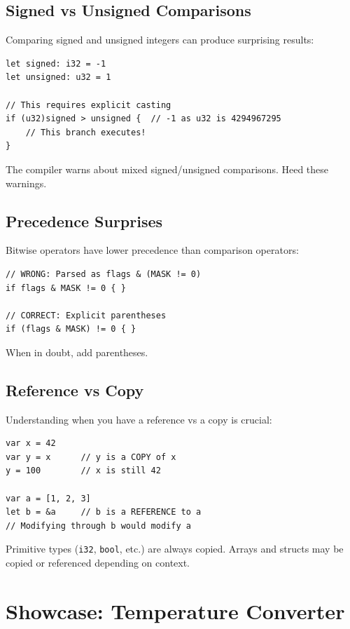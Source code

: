 \subsection{Signed vs Unsigned Comparisons}

Comparing signed and unsigned integers can produce surprising results:

\begin{lstlisting}
let signed: i32 = -1
let unsigned: u32 = 1

// This requires explicit casting
if (u32)signed > unsigned {  // -1 as u32 is 4294967295
    // This branch executes!
}
\end{lstlisting}

The compiler warns about mixed signed/unsigned comparisons. Heed these warnings.

\subsection{Precedence Surprises}

Bitwise operators have lower precedence than comparison operators:

\begin{lstlisting}
// WRONG: Parsed as flags & (MASK != 0)
if flags & MASK != 0 { }

// CORRECT: Explicit parentheses
if (flags & MASK) != 0 { }
\end{lstlisting}

When in doubt, add parentheses.

\subsection{Reference vs Copy}

Understanding when you have a reference vs a copy is crucial:

\begin{lstlisting}
var x = 42
var y = x      // y is a COPY of x
y = 100        // x is still 42

var a = [1, 2, 3]
let b = &a     // b is a REFERENCE to a
// Modifying through b would modify a
\end{lstlisting}

Primitive types (\texttt{i32}, \texttt{bool}, etc.) are always copied. Arrays and structs may be copied or referenced depending on context.

\section{Showcase: Temperature Converter}

